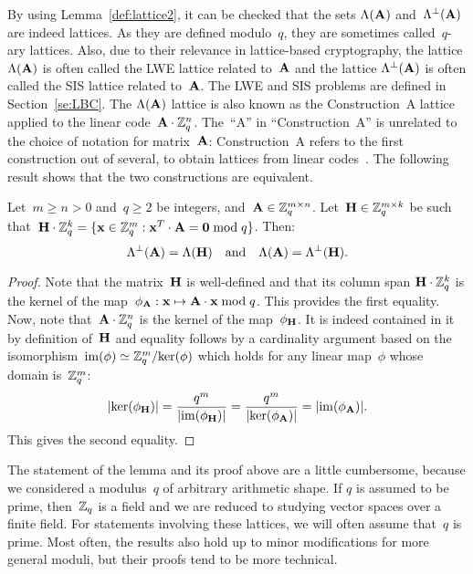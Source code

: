 By using Lemma~\ref{def:lattice2}, it can be checked that the sets $\Lambda({\bf A})$ and~$\Lambda^\perp({\bf A})$ are indeed lattices. As they are defined modulo~$q$, they are sometimes called~$q$-ary lattices. Also, due to their relevance in lattice-based cryptography, the lattice $\Lambda({\bf A})$ is often called the LWE lattice related to~${\bf A}$ and the lattice $\Lambda^\perp({\bf A})$ is often called the SIS lattice related to~${\bf A}$. The LWE and SIS problems are defined in Section~\ref{se:LBC}. The $\Lambda({\bf A})$ lattice is also known as the Construction~A lattice 
applied to the linear code~${\bf A} \cdot \mathbb{Z}_q^n$. The~``A'' in ``Construction~A'' is unrelated to the choice of notation for matrix~${\bf A}$: Construction~A refers to the first construction out of several, to obtain lattices from linear codes~\cite[Chapter~7]{CS99}. 
The following result shows that the two constructions are equivalent. 


\begin{lemma}
\label{le:qary_eq}
Let~$m \geq n >0$ and~$q \geq 2$ be integers, and~${\bf A} \in \mathbb{Z}_q^{m \times n}$.
Let~${\bf H} \in \mathbb{Z}_q^{m \times k}$ be such that~${\bf H} \cdot \mathbb{Z}_q^k = \{ {\bf x} \in  \mathbb{Z}_q^m : {\bf x}^T \cdot {\bf A} = {\bf 0} \bmod q\}$. Then:
\[
\Lambda^\perp({\bf A}) = \Lambda({\bf H}) \ \ \mbox{ and } \ \ \Lambda({\bf A}) =  \Lambda^\perp({\bf H}).
\]
\end{lemma}

\begin{proof}
Note  that the matrix~${\bf H}$ is well-defined and that its column span ${\bf H} \cdot \mathbb{Z}_q^k$ is  the kernel of the 
map~$\phi_{\bf A}: {\bf x} \mapsto {\bf A}\cdot {\bf x} \bmod q$. This provides the first equality. Now, note that~${\bf A} \cdot \mathbb{Z}_q^n$
is  the kernel of the map~$\phi_{\bf H}$. It is indeed contained in it by definition of~${\bf H}$ and equality follows by a cardinality argument
based on the isomorphism~$\mathrm{im}(\phi) \simeq \mathbb{Z}_q^m / \mathrm{ker} (\phi)$ which holds for any linear map~$\phi$ whose domain is~$\mathbb{Z}_q^m$:
\[
|\mathrm{ker}(\phi_{\bf H})| = \frac{q^m}{|\mathrm{im}(\phi_{\bf H})|} = \frac{q^m}{|\mathrm{ker}(\phi_{\bf A})|} = |\mathrm{im}( \phi_{\bf A})|.
\]
This gives the second equality.
\end{proof}

The statement of the lemma and its proof above are a little cumbersome, because we considered a modulus~$q$ of arbitrary arithmetic shape. If $q$ is assumed to be prime, then~$\mathbb{Z}_q$ is a field and we are reduced to studying vector spaces over a finite field. For statements involving these lattices, we will often assume that~$q$ is prime. Most often, the results also hold up to minor modifications for more general moduli, but their proofs tend to be more technical.


